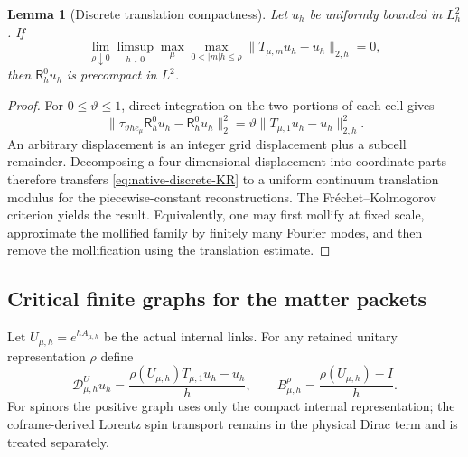 \documentclass[11pt]{article}
\numberwithin{equation}{section}
\newtheorem{lemma}[lemma]{Lemma}
\theoremstyle{definition}
\theoremstyle{remark}
\newcommand{\norm}[1]{\lVert#1\rVert}
\begin{document}
\begin{lemma}[Discrete translation compactness]
\label{lem:native-discrete-KR}
Let $u_h$ be uniformly bounded in $L_h^2$.  If
\begin{equation}
 \lim_{\rho\downarrow0}\limsup_{h\downarrow0}
 \max_\mu\max_{0<|m|h\le\rho}
 \norm{T_{\mu,m}u_h-u_h}_{2,h}=0,
 \label{eq:native-discrete-KR}
\end{equation}
then $\mathsf R_h^0u_h$ is precompact in $L^2$.
\end{lemma}
\begin{proof}
For $0\le\vartheta\le1$, direct integration on the two portions of each
cell gives
\[
 \norm{\tau_{\vartheta h e_\mu}\mathsf R_h^0u_h-
       \mathsf R_h^0u_h}_2^2
 =\vartheta\norm{T_{\mu,1}u_h-u_h}_{2,h}^2.
\]
An arbitrary displacement is an integer grid displacement plus a subcell
remainder.  Decomposing a four-dimensional displacement into coordinate
parts therefore transfers \eqref{eq:native-discrete-KR} to a uniform
continuum translation modulus for the piecewise-constant reconstructions.
The Fr\'echet--Kolmogorov criterion yields the result.  Equivalently, one may
first mollify at fixed scale, approximate the mollified family by finitely
many Fourier modes, and then remove the mollification using the translation
estimate.
\end{proof}

\subsection{Critical finite graphs for the matter packets}

Let $U_{\mu,h}=e^{hA_{\mu,h}}$ be the actual internal links.  For any retained
unitary representation $\rho$ define
\begin{equation}
 \mathcal D^U_{\mu,h}u_h
 =\frac{\rho(U_{\mu,h})T_{\mu,1}u_h-u_h}{h},
 \qquad
 B^\rho_{\mu,h}=\frac{\rho(U_{\mu,h})-I}{h}.
 \label{eq:native-internal-graph}
\end{equation}
For spinors the positive graph uses only the compact internal representation;
the coframe-derived Lorentz spin transport remains in the physical Dirac
term and is treated separately.
\end{document}
